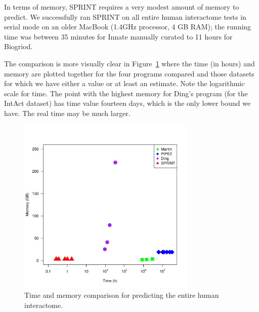 In terms of memory, SPRINT requires a very modest amount of memory to predict. We successfully ran SPRINT on all entire human interactome tests in serial mode on an older MacBook (1.4GHz processor, 4 GB RAM); the running time was between 35 minutes for Innate manually curated to 11 hours for Biogriod. 

The comparison is more visually clear in Figure~\ref{fig_time_memory} where the time (in hours) and memory are plotted together for the four programs compared and those datasets for which we have either a value or at least an estimate. Note the logarithmic scale for time. The point with the highest memory for Ding's program (for the IntAct dataset) has time value fourteen days, which is the only lower bound we have. The real time may be  much larger. 


\begin{figure}[h!]
\centering
\includegraphics[width=8.5cm]{img/fig_time_memory.pdf}
\caption{Time and memory comparison for predicting the entire human interactome. \label{fig_time_memory}}
\end{figure}

